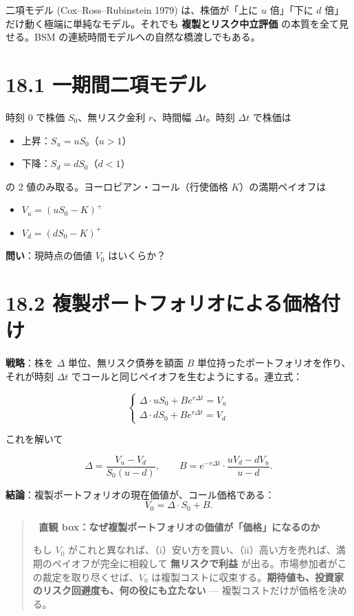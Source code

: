 \documentclass[11pt,a4paper]{report}
\begin{document}
二項モデル (Cox–Ross–Rubinstein 1979) は、株価が「上に $u$ 倍」「下に $d$ 倍」だけ動く極端に単純なモデル。それでも \textbf{複製とリスク中立評価} の本質を全て見せる。BSM の連続時間モデルへの自然な橋渡しでもある。

\section{18.1 一期間二項モデル}

時刻 0 で株価 $S_0$、無リスク金利 $r$、時間幅 $\Delta t$。時刻 $\Delta t$ で株価は

\begin{itemize}
\item 上昇：$S_u = u S_0$（$u > 1$）
\item 下降：$S_d = d S_0$（$d < 1$）
\end{itemize}

の 2 値のみ取る。ヨーロピアン・コール（行使価格 $K$）の満期ペイオフは

\begin{itemize}
\item $V_u = (u S_0 - K)^+$
\item $V_d = (d S_0 - K)^+$
\end{itemize}

\textbf{問い}：現時点の価値 $V_0$ はいくらか？

\section{18.2 複製ポートフォリオによる価格付け}

\textbf{戦略}：株を $\Delta$ 単位、無リスク債券を額面 $B$ 単位持ったポートフォリオを作り、それが時刻 $\Delta t$ でコールと同じペイオフを生むようにする。連立式：

\[ \begin{cases} \Delta \cdot u S_0 + B e^{r \Delta t} = V_u \\ \Delta \cdot d S_0 + B e^{r \Delta t} = V_d \end{cases} \]

これを解いて

\[ \Delta = \frac{V_u - V_d}{S_0 (u - d)}, \qquad B = e^{-r\Delta t} \cdot \frac{u V_d - d V_u}{u - d}. \]

\textbf{結論}：複製ポートフォリオの現在価値が、コール価格である： \[ V_0 = \Delta \cdot S_0 + B. \]

\begin{quote}
🎯 \textbf{直観 box：なぜ複製ポートフォリオの価値が「価格」になるのか}

もし $V_0$ がこれと異なれば、（i）安い方を買い、（ii）高い方を売れば、満期のペイオフが完全に相殺して \textbf{無リスクで利益} が出る。市場参加者がこの裁定を取り尽くせば、$V_0$ は複製コストに収束する。\textbf{期待値も、投資家のリスク回避度も、何の役にも立たない} — 複製コストだけが価格を決める。
\end{quote}
\end{document}
